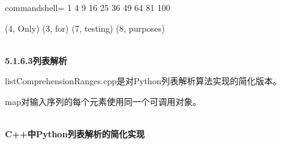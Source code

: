 \begin{tcblisting}{ commandshell={}}
1 4 9 16 25 36 49 64 81 100

(4, Only) (3, for) (7, testing) (8, purposes)
\end{tcblisting}

\hspace*{\fill} \\ %
\noindent
\textbf{5.1.6.3\hspace{0.2cm}列表解析}

listComprehensionRanges.cpp是对Python列表解析算法实现的简化版本。

map对输入序列的每个元素使用同一个可调用对象。

\hspace*{\fill} \\ %
\noindent
\textbf{C++中Python列表解析的简化实现}
